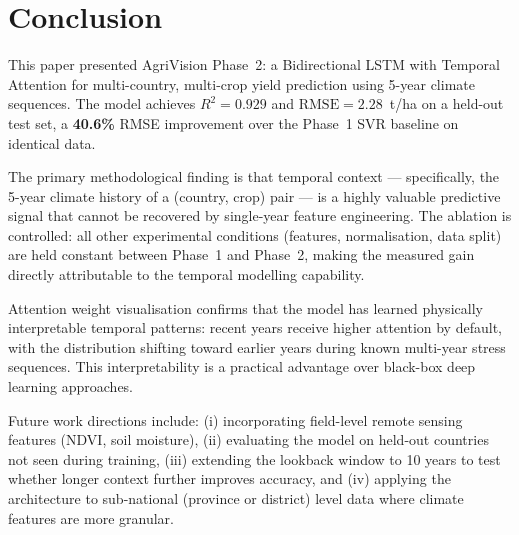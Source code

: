 \documentclass[conference]{IEEEtran}
\begin{document}
\section{Conclusion}
\label{sec:conclusion}

This paper presented AgriVision Phase~2: a Bidirectional LSTM with Temporal Attention
for multi-country, multi-crop yield prediction using 5-year climate sequences.
The model achieves $R^2 = 0.929$ and $\text{RMSE} = 2.28$~t/ha on a held-out test set,
a \textbf{40.6\%} RMSE improvement over the Phase~1 SVR baseline on identical data.

The primary methodological finding is that temporal context — specifically, the
5-year climate history of a (country, crop) pair — is a highly valuable predictive
signal that cannot be recovered by single-year feature engineering.
The ablation is controlled: all other experimental conditions (features, normalisation,
data split) are held constant between Phase~1 and Phase~2, making the measured gain
directly attributable to the temporal modelling capability.

Attention weight visualisation confirms that the model has learned physically
interpretable temporal patterns: recent years receive higher attention by default,
with the distribution shifting toward earlier years during known multi-year stress
sequences.
This interpretability is a practical advantage over black-box deep learning approaches.

Future work directions include:
(i) incorporating field-level remote sensing features (NDVI, soil moisture),
(ii) evaluating the model on held-out countries not seen during training,
(iii) extending the lookback window to 10 years to test whether longer context
further improves accuracy, and
(iv) applying the architecture to sub-national (province or district) level data
where climate features are more granular.
\end{document}

